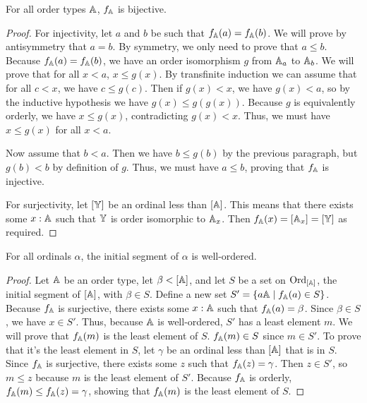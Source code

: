 \documentclass[../../math.tex]{subfiles}
\begin{document}
\begin{theorem}
    For all order types $\mathbb{A}$, $f_{\mathbb{A}}$ is bijective.
\end{theorem}
\begin{proof}
    For injectivity, let $a$ and $b$ be such that $f_{\mathbb{A}}(a) = f_{\mathbb{A}}(b)$.  We will
    prove by antisymmetry that $a = b$.  By symmetry, we only need to prove that
    $a \leq b$.  Because $f_{\mathbb{A}}(a) = f_{\mathbb{A}}(b)$, we have an order isomorphism $g$
    from $\mathbb{A}_a$ to $\mathbb{A}_b$.  We will prove that for all $x < a$, $x \leq g(x)$.
    By transfinite induction we can assume that for all $c < x$, we have
    $c \leq g(c)$.  Then if $g(x) < x$, we have $g(x) < a$, so by the inductive
    hypothesis we have $g(x) \leq g(g(x))$.  Because $g$ is equivalently
    orderly, we have $x \leq g(x)$, contradicting $g(x) < x$.  Thus, we must
    have $x \leq g(x)$ for all $x < a$.

    Now assume that $b < a$.  Then we have $b \leq g(b)$ by the previous
    paragraph, but $g(b) < b$ by definition of $g$.  Thus, we must have $a \leq
    b$, proving that $f_{\mathbb{A}}$ is injective.

    For surjectivity, let $[\mathbb{Y}]$ be an ordinal less than $[\mathbb{A}]$.  This means
    that there exists some $x : \mathbb{A}$ such that $\mathbb{Y}$ is order isomorphic to
    $\mathbb{A}_x$.  Then $f_{\mathbb{A}}(x) = [\mathbb{A}_x] = [\mathbb{Y}]$ as required.
\end{proof}

\begin{lemma} \label{ords_lt_wo}
    For all ordinals $\alpha$, the initial segment of $\alpha$ is well-ordered.
\end{lemma}
\begin{proof}
    Let $\mathbb{A}$ be an order type, let $\beta < [\mathbb{A}]$, and let $S$ be a set on
    $\operatorname{Ord}_{[\mathbb{A}]}$, the initial segment of $[\mathbb{A}]$, with $\beta \in S$.  Define a
    new set $S' = \{a \mathbb{A} \mid f_{\mathbb{A}}(a) \in S\}$.  Because $f_{\mathbb{A}}$ is surjective,
    there exists some $x : \mathbb{A}$ such that $f_{\mathbb{A}}(a) = \beta$.  Since $\beta \in
    S$, we have $x \in S'$.  Thus, because $\mathbb{A}$ is well-ordered, $S'$ has a
    least element $m$.  We will prove that $f_{\mathbb{A}}(m)$ is the least element of
    $S$.  $f_{\mathbb{A}}(m) \in S$ since $m \in S'$.  To prove that it's the least
    element in $S$, let $\gamma$ be an ordinal less than $[\mathbb{A}]$ that is in $S$.
    Since $f_{\mathbb{A}}$ is surjective, there exists some $z$ such that $f_{\mathbb{A}}(z) =
    \gamma$.  Then $z \in S'$, so $m \leq z$ because $m$ is the least element of
    $S'$.  Because $f_{\mathbb{A}}$ is orderly, $f_{\mathbb{A}}(m) \leq f_{\mathbb{A}}(z) = \gamma$, showing
    that $f_{\mathbb{A}}(m)$ is the least element of $S$.
\end{proof}
\end{document}
